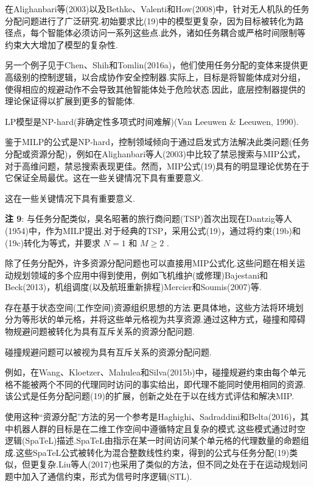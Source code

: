 \documentclass[10pt]{article}
\begin{document}
在Alighanbari等(2003)以及Bethke、Valenti和How(2008)中，针对无人机队的任务分配问题进行了广泛研究.初始要求比(19)中的模型更复杂，因为目标被转化为路径点，每个智能体必须访问一系列这些点.此外，诸如任务耦合或严格时间限制等约束大大增加了模型的复杂性.

另一个例子见于Chen、Shih和Tomlin(2016a)，他们使用任务分配的变体来提供更高级别的控制逻辑，以合成协作安全控制器.实际上，目标是将智能体成对分组，使得相应的规避动作不会导致其他智能体处于危险状态.因此，底层控制器提供的理论保证得以扩展到更多的智能体.

LP模型是NP-hard(非确定性多项式时间难解)(Van Leeuwen \& Leeuwen, 1990).

鉴于MILP的公式是NP-hard，控制领域倾向于通过启发式方法解决此类问题(任务分配或资源分配)，例如在Alighanbari等人(2003)中比较了禁忌搜索与MIP公式，对于高维问题，禁忌搜索表现更佳。然而，MIP公式(19)具有的明显理论优势在于它保证全局最优。这在一些关键情况下具有重要意义.

这在一些关键情况下具有重要意义.

\vspace{1 em}
\noindent\textbf{注 9}: 与任务分配类似，臭名昭著的旅行商问题(TSP)首次出现在Dantzig等人(1954)中，作为MILP提出.对于经典的TSP，采用公式(19)，通过将约束(19b)和(19c)转化为等式，并要求 \(N = 1\) 和 \(M \geq  2\) .
\vspace{1 em}

除了任务分配外，许多资源分配问题也可以直接用MIP公式化.这些问题在相关运动规划领域的多个应用中得到使用，例如飞机维护(或修理)Bajestani和Beck(2013)，机组调度(以及航班重新排程)Mercier和Soumis(2007)等.

存在基于状态空间(工作空间)资源组织思想的方法.更具体地，这些方法将环境划分为等形状的单元格，并将这些单元格视为共享资源.通过这种方式，碰撞和障碍物规避问题被转化为具有互斥关系的资源分配问题.

碰撞规避问题可以被视为具有互斥关系的资源分配问题.

例如，在Wang、Kloetzer、Mahulea和Silva(2015b)中，碰撞规避约束由每个单元格不能被两个不同的代理同时访问的事实给出，即代理不能同时使用相同的资源.该公式是任务分配问题(19)的扩展，创新之处在于以在线方式评估和解决MIP.

使用这种“资源分配”方法的另一个参考是Haghighi、Sadraddini和Belta(2016)，其中机器人群的目标是在二维工作空间中遵循特定且复杂的模式.这些模式通过时空逻辑(SpaTeL)描述.SpaTeL由指示在某一时间访问某个单元格的代理数量的命题组成.这些SpaTeL公式被转化为混合整数线性约束，得到的公式与任务分配(19)类似，但更复杂.Liu等人(2017)也采用了类似的方法，但不同之处在于在运动规划问题中加入了通信约束，形式为信号时序逻辑(STL).
\end{document}
